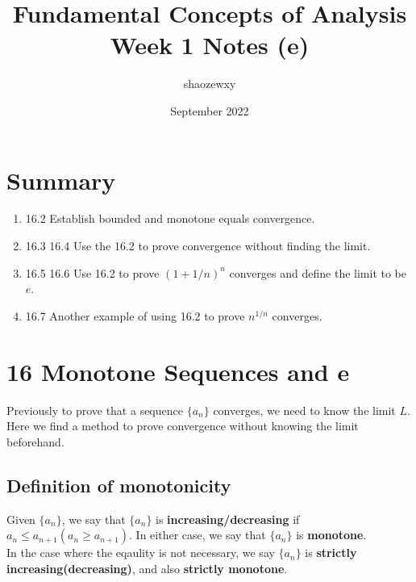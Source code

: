 \documentclass{article}
\title{Fundamental Concepts of Analysis\\
\large{Week 1 Notes (e)}}
\author{shaozewxy }
\date{September 2022}
\begin{document}
\maketitle
\section*{Summary}
\begin{enumerate}
    \item 16.2 Establish bounded and monotone equals convergence.
    \item 16.3 16.4 Use the 16.2 to prove convergence without finding the limit.
    \item 16.5 16.6 Use 16.2 to prove $(1+1/n)^n$ converges and define the limit to be $e$.
    \item 16.7 Another example of using 16.2 to prove $n^{1/n}$ converges.
\end{enumerate}
\section*{16 Monotone Sequences and \textbf{e}}
Previously to prove that a sequence $\{a_n\}$ converges, we need to know the limit $L$.\\
Here we find a method to prove convergence without knowing the limit beforehand.
\subsection*{Definition of monotonicity}
Given $\{a_n\}$, we say that $\{a_n\}$ is \textbf{increasing/decreasing} if $a_n \leq a_{n+1} (a_n \geq a_{n+1})$. In either case, we say that $\{a_n\}$ is \textbf{monotone}.\\
In the case where the eqaulity is not necessary, we say $\{a_n\}$ is \textbf{strictly increasing(decreasing)}, and also \textbf{strictly monotone}.
\end{document}
